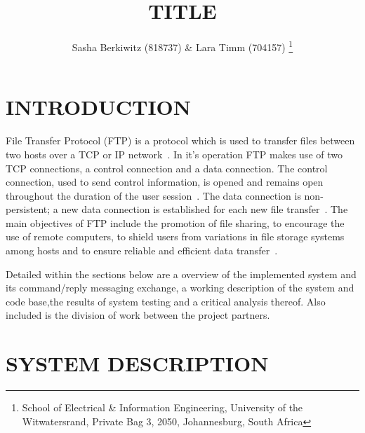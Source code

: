 \documentclass[10pt,twocolumn]{witseiepaper}
\begin{document}
\title{TITLE}

\author{Sasha Berkiwitz (818737) \& Lara Timm (704157)
\thanks{School of Electrical \& Information Engineering, University of the
Witwatersrand, Private Bag 3, 2050, Johannesburg, South Africa}
}


%
\abstract{}

\keywords{}

\maketitle
\pagestyle{plain}
\setcounter{page}{1}


\section{INTRODUCTION}

File Transfer Protocol (FTP) is a protocol which is used  to transfer files between two hosts over a TCP or IP network~\cite{FTPbeginners}. In it's operation FTP makes use of two TCP connections, a control connection and a data connection. The control connection, used to send control information, is opened and remains open throughout the duration of the user session~\cite{topDownApproach6th}. The data connection is non-persistent; a new data connection is established for each new file transfer~\cite{topDownApproach6th}. The main objectives of FTP include the promotion of file sharing, to encourage the use of remote computers, to shield users from variations in file storage systems among hosts and to ensure reliable and efficient data transfer~\cite{rfc959}. 


Detailed within the sections below are a overview of the implemented system and its command/reply messaging exchange, a working description of the system and code base,the results of system testing and a critical analysis thereof. Also included is the division of work between the project partners.

\section{SYSTEM DESCRIPTION} 
\end{document}
